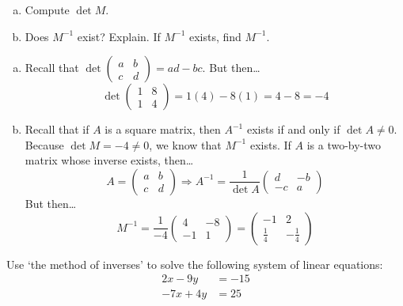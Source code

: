 \documentclass[11pt,letterpaper]{article}
\begin{document}
\begin{enumerate}[(a)]
\item Compute $\det M$. 
\item Does $M^{-1}$ exist? Explain. If $M^{-1}$ exists, find $M^{-1}$. 
\end{enumerate} \pspace

\sol 
\begin{enumerate}[(a)]
\item Recall that $\det \begin{pmatrix} a & b \\ c & d \end{pmatrix}= ad - bc$. But then\dots
	\[
	\det \begin{pmatrix} 1 & 8 \\ 1 & 4 \end{pmatrix}= 1(4) - 8(1)= 4 - 8= -4
	\]

\item Recall that if $A$ is a square matrix, then $A^{-1}$ exists if and only if $\det A \neq 0$. Because $\det M= -4 \neq 0$, we know that $M^{-1}$ exists. If $A$ is a two-by-two matrix whose inverse exists, then\dots
	\[
	A= \begin{pmatrix} a & b \\ c & d \end{pmatrix} \Longrightarrow A^{-1}= \dfrac{1}{\det A} \begin{pmatrix} d & -b \\ -c & a \end{pmatrix}
	\]
But then\dots
	\[
	M^{-1}= \dfrac{1}{-4} \begin{pmatrix} 4 & -8 \\ -1 & 1 \end{pmatrix}= \begin{pmatrix} -1 & 2 \\ \frac{1}{4} & -\frac{1}{4} \end{pmatrix} 
	\]
\end{enumerate}



\newpage



 Use `the method of inverses' to solve the following system of linear equations:
	\[
	\begin{aligned}
	2x - 9y&= -15 \\
	-7x + 4y&= 25
	\end{aligned}
	\] \pspace
\end{document}
